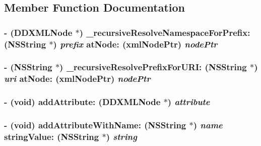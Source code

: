 \subsection{Member Function Documentation}
\hypertarget{class_d_d_x_m_l_element_acbb529f3c7f73cc7569eb9e33de5ff87}{
\subsubsection[{\_\-recursiveResolveNamespaceForPrefix:atNode:}]{\setlength{\rightskip}{0pt plus 5cm}-\/ ({\bf DDXMLNode} $\ast$) \_\-recursiveResolveNamespaceForPrefix: ({\bf NSString} $\ast$) {\em prefix}\/ atNode: (xmlNodePtr) {\em nodePtr}}}
\label{class_d_d_x_m_l_element_acbb529f3c7f73cc7569eb9e33de5ff87}
\hypertarget{class_d_d_x_m_l_element_a90f75ab79816e6938433e58b960f3922}{
\subsubsection[{\_\-recursiveResolvePrefixForURI:atNode:}]{\setlength{\rightskip}{0pt plus 5cm}-\/ ({\bf NSString} $\ast$) \_\-recursiveResolvePrefixForURI: ({\bf NSString} $\ast$) {\em uri}\/ atNode: (xmlNodePtr) {\em nodePtr}}}
\label{class_d_d_x_m_l_element_a90f75ab79816e6938433e58b960f3922}
\hypertarget{class_d_d_x_m_l_element_a90f579bbd747393513df84449201c85f}{
\subsubsection[{addAttribute:}]{\setlength{\rightskip}{0pt plus 5cm}-\/ (void) addAttribute: ({\bf DDXMLNode} $\ast$) {\em attribute}}}
\label{class_d_d_x_m_l_element_a90f579bbd747393513df84449201c85f}
\hypertarget{class_d_d_x_m_l_element_a2a7ef778f931f0fa44e9992a67864957}{
\subsubsection[{addAttributeWithName:stringValue:}]{\setlength{\rightskip}{0pt plus 5cm}-\/ (void) addAttributeWithName: ({\bf NSString} $\ast$) {\em name}\/ stringValue: ({\bf NSString} $\ast$) {\em string}}}

